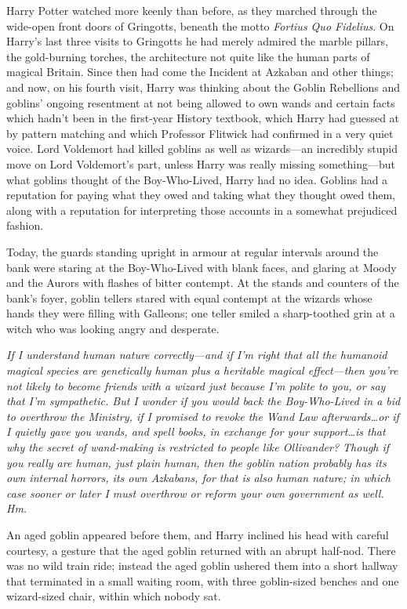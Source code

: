 Harry Potter watched more keenly than before, as they marched through the wide-open front doors of Gringotts, beneath the motto \emph{Fortius Quo Fidelius}. On Harry’s last three visits to Gringotts he had merely admired the marble pillars, the gold-burning torches, the architecture not quite like the human parts of magical Britain. Since then had come the Incident at Azkaban and other things; and now, on his fourth visit, Harry was thinking about the Goblin Rebellions and goblins’ ongoing resentment at not being allowed to own wands and certain facts which hadn’t been in the first-year History textbook, which Harry had guessed at by pattern matching and which Professor Flitwick had confirmed in a very quiet voice. Lord Voldemort had killed goblins as well as wizards—an incredibly stupid move on Lord Voldemort’s part, unless Harry was really missing something—but what goblins thought of the Boy-Who-Lived, Harry had no idea. Goblins had a reputation for paying what they owed and taking what they thought owed them, along with a reputation for interpreting those accounts in a somewhat prejudiced fashion.

Today, the guards standing upright in armour at regular intervals around the bank were staring at the Boy-Who-Lived with blank faces, and glaring at Moody and the Aurors with flashes of bitter contempt. At the stands and counters of the bank’s foyer, goblin tellers stared with equal contempt at the wizards whose hands they were filling with Galleons; one teller smiled a sharp-toothed grin at a witch who was looking angry and desperate.

\emph{If I understand human nature correctly—and if I’m right that all the humanoid magical species are genetically human plus a heritable magical effect—then you’re not likely to become friends with a wizard just because I’m polite to you, or say that I’m sympathetic. But I wonder if you would back the Boy-Who-Lived in a bid to overthrow the Ministry, if I promised to revoke the Wand Law afterwards…or if I quietly gave you wands, and spell books, in exchange for your support…is that why the secret of wand-making is restricted to people like Ollivander? Though if you really are human, just plain human, then the goblin nation probably has its own internal horrors, its own Azkabans, for that is also human nature; in which case sooner or later I must overthrow or reform your own government as well. Hm.}

An aged goblin appeared before them, and Harry inclined his head with careful courtesy, a gesture that the aged goblin returned with an abrupt half-nod. There was no wild train ride; instead the aged goblin ushered them into a short hallway that terminated in a small waiting room, with three goblin-sized benches and one wizard-sized chair, within which nobody sat.

